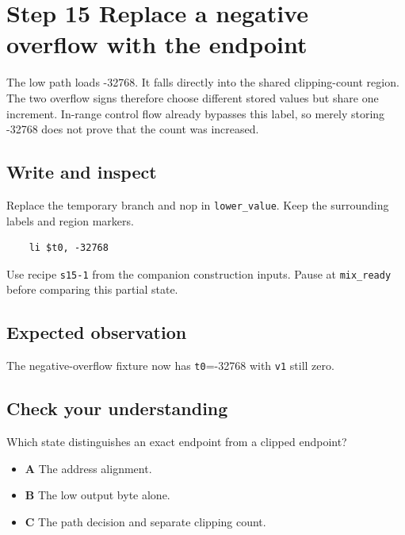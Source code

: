\section{Step 15 Replace a negative overflow with the endpoint}\label{pcm-s15}

The low path loads -32768. It falls directly into the shared clipping-count region. The two overflow signs therefore choose different stored values but share one increment. In-range control flow already bypasses this label, so merely storing -32768 does not prove that the count was increased.

\subsection{Write and inspect}
Replace the temporary branch and nop in \texttt{lower\_value}. Keep the surrounding labels and region markers.

\begin{verbatim}
    li $t0, -32768
\end{verbatim}
Use recipe \texttt{s15-1} from the companion construction inputs. Pause at \texttt{mix\_ready} before comparing this partial state.

\subsection{Expected observation}
The negative-overflow fixture now has \texttt{t0}=-32768 with \texttt{v1} still zero.

\subsection{Check your understanding}
Which state distinguishes an exact endpoint from a clipped endpoint?

\begin{itemize}
\item \textbf{A} The address alignment.
\item \textbf{B} The low output byte alone.
\item \textbf{C} The path decision and separate clipping count.
\end{itemize}
